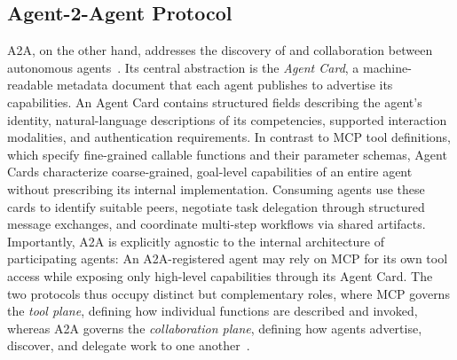 \subsection{Agent-2-Agent Protocol}
A2A, on the other hand, addresses the discovery of and collaboration between autonomous agents~\cite{google2024a2a}. Its central abstraction is the \emph{Agent Card}, a machine-readable metadata document that each agent publishes to advertise its capabilities. An Agent Card contains structured fields describing the agent's identity, natural-language descriptions of its competencies, supported interaction modalities, and authentication requirements. In contrast to MCP tool definitions, which specify fine-grained callable functions and their parameter schemas, Agent Cards characterize coarse-grained, goal-level capabilities of an entire agent without prescribing its internal implementation. Consuming agents use these cards to identify suitable peers, negotiate task delegation through structured message exchanges, and coordinate multi-step workflows via shared artifacts. Importantly, A2A is explicitly agnostic to the internal architecture of participating agents: An A2A-registered agent may rely on MCP for its own tool access while exposing only high-level capabilities through its Agent Card. The two protocols thus occupy distinct but complementary roles, where MCP governs the \emph{tool plane}, defining how individual functions are described and invoked, whereas A2A governs the \emph{collaboration plane}, defining how agents advertise, discover, and delegate work to one another~\cite{ehtesham2025surveyagentinteroperabilityprotocols}.